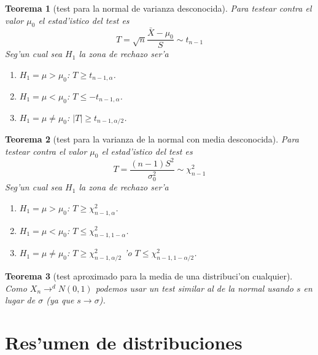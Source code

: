 \documentclass[a4paper,spanish]{article}
\newcommand{\tiended}[0]{\longrightarrow^d}
\newtheorem{teo}{Teorema}
\begin{document}
\begin{teo}[test para la normal de varianza desconocida]
Para testear contra el valor $\mu_0$ el estad'istico del test es
$$T = \sqrt{n} \frac{\bar{X}-\mu_0}{S} \sim t_{n-1}$$
Seg'un cual sea $H_1$ la zona de rechazo ser'a
\begin{enumerate} 
\item $H_1 = \mu > \mu_0$: $T \geq t_{n-1,\alpha}$.
\item $H_1 = \mu < \mu_0$: $T \leq -t_{n-1,\alpha}$.
\item $H_1 = \mu \neq \mu_0$: $|T| \geq t_{n-1,\alpha/2}$.
\end{enumerate}
\end{teo}

\begin{teo}[test para la varianza de la normal con media desconocida]
Para testear contra el valor $\mu_0$ el estad'istico del test es
$$T = \frac{(n-1)S^2}{\sigma_0^2} \sim \chi^2_{n-1}$$
Seg'un cual sea $H_1$ la zona de rechazo ser'a
\begin{enumerate} 
\item $H_1 = \mu > \mu_0$: $T \geq \chi^2_{n-1,\alpha}$.
\item $H_1 = \mu < \mu_0$: $T \leq \chi^2_{n-1,1-\alpha}$.
\item $H_1 = \mu \neq \mu_0$: $T \geq \chi^2_{n-1,\alpha/2}$ 'o 
	$T \leq \chi^2_{n-1,1-\alpha/2}$.
\end{enumerate}
\end{teo}

\begin{teo}[test aproximado para la media de una distribuci'on cualquier]
Como $X_n \tiended N(0,1)$ podemos usar un test similar al de la normal usando
$s$ en lugar de $\sigma$ (ya que $s \rightarrow \sigma$).
\end{teo}

\newpage

\section{Res'umen de distribuciones}
\label{sec:resumen}
\end{document}
